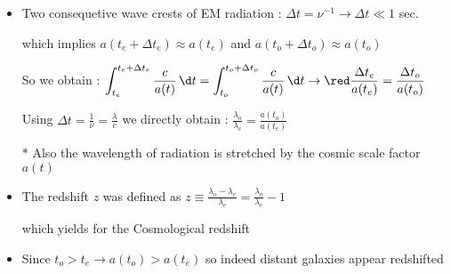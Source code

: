 \Tr
\begin{itemize}
\item Two consequetive wave crests of EM radiation : $\Delta t=\nu^{-1} \rightarrow \Delta t \ll 1$ sec.
\item[] which implies {\blue $a(t_{e}+\Delta t_{e}) \approx a(t_{e})$} and
        {\blue $a(t_{o}+\Delta t_{o}) \approx a(t_{o})$}
\item[] So we obtain : $\displaystyle \int_{t_{e}}^{t_{e}+\Delta t_{e}} \frac{c}{a(t)}\,\d t =
        \int_{t_{o}}^{t_{o}+\Delta t_{o}} \frac{c}{a(t)}\,\d t
        \rightarrow {\red \frac{\Delta t_{e}}{a(t_{e})}=\frac{\Delta t_{o}}{a(t_{o})}}$
\item[] Using $\displaystyle \Delta t=\frac{1}{\nu}=\frac{\lambda}{c}$ we directly obtain :
        {\blue $\displaystyle \frac{\lambda_{o}}{\lambda_{e}}=\frac{a(t_{o})}{a(t_{e})}$}
\item[$\ast$] {\blue Also the wavelength of radiation is stretched by the cosmic scale factor $a(t)$}
\item The redshift $z$ was defined as
      $\displaystyle z \equiv \frac{\lambda_{o}-\lambda_{e}}{\lambda_{e}}=\frac{\lambda_{o}}{\lambda_{e}}-1$
\item[] which yields for the {\blue Cosmological redshift}
\item[] \begin{center}
        {\red {}}
        \end{center}
\item Since $t_{o}>t_{e} \rightarrow a(t_{o})>a(t_{e})$ so indeed distant galaxies appear redshifted
\end{itemize}

